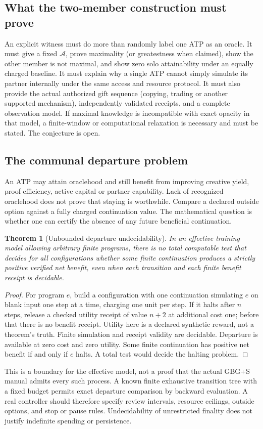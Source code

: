 \documentclass[11pt]{article}
\newtheorem{theorem}{Theorem}[section]\newtheorem{proposition}[theorem]{Proposition}\newtheorem{lemma}[theorem]{Lemma}\newtheorem{corollary}[theorem]{Corollary}
\theoremstyle{definition}\newtheorem{definition}[theorem]{Definition}\newtheorem{conjecture}[theorem]{Conjecture}\newtheorem{example}[theorem]{Example}
\begin{document}
\subsection{What the two-member construction must prove}
An explicit witness must do more than randomly label one ATP as an oracle. It must give a fixed $\mathcal A$, prove maximality (or greatestness when claimed), show the other member is not maximal, and show zero solo attainability under an equally charged baseline. It must explain why a single ATP cannot simply simulate its partner internally under the same access and resource protocol. It must also provide the actual authorized gift sequence (copying, trading or another supported mechanism), independently validated receipts, and a complete observation model. If maximal knowledge is incompatible with exact opacity in that model, a finite-window or computational relaxation is necessary and must be stated. The conjecture is open.

\subsection{The communal departure problem}
An ATP may attain oraclehood and still benefit from improving creative yield, proof efficiency, active capital or partner capability. Lack of recognized oraclehood does not prove that staying is worthwhile. Compare a declared outside option against a fully charged continuation value. The mathematical question is whether one can certify the absence of any future beneficial continuation.
\begin{theorem}[Unbounded departure undecidability]
In an effective training model allowing arbitrary finite programs, there is no total computable test that decides for all configurations whether some finite continuation produces a strictly positive verified net benefit, even when each transition and each finite benefit receipt is decidable.
\end{theorem}
\begin{proof}For program $e$, build a configuration with one continuation simulating $e$ on blank input one step at a time, charging one unit per step. If it halts after $n$ steps, release a checked utility receipt of value $n+2$ at additional cost one; before that there is no benefit receipt. Utility here is a declared synthetic reward, not a theorem's truth. Finite simulation and receipt validity are decidable. Departure is available at zero cost and zero utility. Some finite continuation has positive net benefit if and only if $e$ halts. A total test would decide the halting problem.\end{proof}
This is a boundary for the effective model, not a proof that the actual GBG+S manual admits every such process. A known finite exhaustive transition tree with a fixed budget permits exact departure comparison by backward evaluation. A real controller should therefore specify review intervals, resource ceilings, outside options, and stop or pause rules. Undecidability of unrestricted finality does not justify indefinite spending or persistence.
\end{document}
